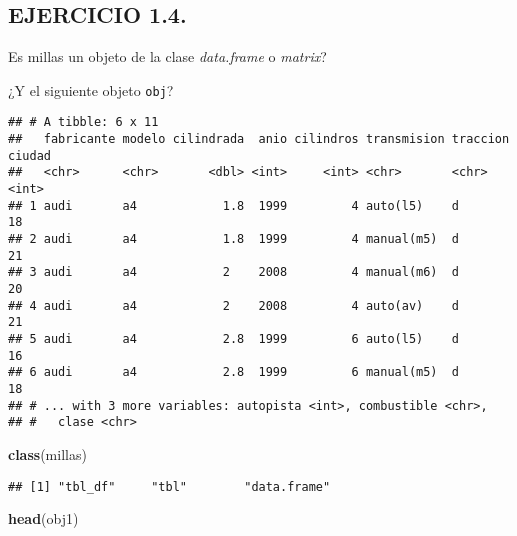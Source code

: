 \documentclass[]{article}
\newenvironment{Shaded}{\begin{snugshade}}{\end{snugshade}}
\newcommand{\CommentTok}[1]{\textcolor[rgb]{0.56,0.35,0.01}{\textit{#1}}}
\newcommand{\KeywordTok}[1]{\textcolor[rgb]{0.13,0.29,0.53}{\textbf{#1}}}
\newcommand{\NormalTok}[1]{#1}
\newcommand{\OperatorTok}[1]{\textcolor[rgb]{0.81,0.36,0.00}{\textbf{#1}}}
\newcommand{\StringTok}[1]{\textcolor[rgb]{0.31,0.60,0.02}{#1}}
\begin{document}
\hypertarget{ejercicio-1.4.}{%
\subsection{EJERCICIO 1.4.}\label{ejercicio-1.4.}}

Es millas un objeto de la clase \emph{data.frame} o \emph{matrix}?

¿Y el siguiente objeto \texttt{obj}?

\begin{Shaded}
\end{Shaded}

\begin{verbatim}
## # A tibble: 6 x 11
##   fabricante modelo cilindrada  anio cilindros transmision traccion ciudad
##   <chr>      <chr>       <dbl> <int>     <int> <chr>       <chr>     <int>
## 1 audi       a4            1.8  1999         4 auto(l5)    d            18
## 2 audi       a4            1.8  1999         4 manual(m5)  d            21
## 3 audi       a4            2    2008         4 manual(m6)  d            20
## 4 audi       a4            2    2008         4 auto(av)    d            21
## 5 audi       a4            2.8  1999         6 auto(l5)    d            16
## 6 audi       a4            2.8  1999         6 manual(m5)  d            18
## # ... with 3 more variables: autopista <int>, combustible <chr>,
## #   clase <chr>
\end{verbatim}

\begin{Shaded}
\begin{Highlighting}[]
\KeywordTok{class}\NormalTok{(millas)}
\end{Highlighting}
\end{Shaded}

\begin{verbatim}
## [1] "tbl_df"     "tbl"        "data.frame"
\end{verbatim}

\begin{Shaded}
\begin{Highlighting}[]
\KeywordTok{head}\NormalTok{(obj1)}
\end{Highlighting}
\end{Shaded}
\end{document}
